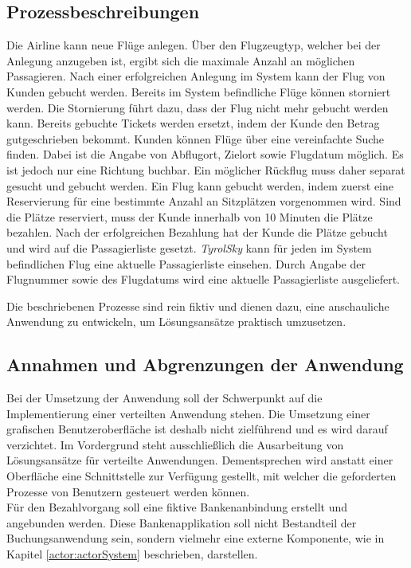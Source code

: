\subsection{Prozessbeschreibungen}
\begin{enumerate}
     Die Airline kann neue Flüge anlegen. Über den Flugzeugtyp, welcher bei der Anlegung anzugeben ist, ergibt sich die maximale Anzahl an möglichen Passagieren. Nach einer erfolgreichen Anlegung im System kann der Flug von Kunden gebucht werden.
     Bereits im System befindliche Flüge können storniert werden. Die Stornierung führt dazu, dass der Flug nicht mehr gebucht werden kann. Bereits gebuchte Tickets werden  ersetzt, indem der Kunde den Betrag gutgeschrieben bekommt.
    Kunden können Flüge über eine vereinfachte Suche finden. Dabei ist die Angabe von Abflugort, Zielort sowie Flugdatum möglich. Es ist jedoch nur  eine Richtung buchbar. Ein möglicher Rückflug muss daher separat gesucht und gebucht werden. 
    Ein Flug kann gebucht werden, indem zuerst eine Reservierung für eine bestimmte Anzahl an Sitzplätzen vorgenommen wird. Sind die Plätze reserviert, muss der Kunde innerhalb von 10 Minuten die Plätze bezahlen. Nach der erfolgreichen Bezahlung hat der Kunde die Plätze gebucht und wird auf die Passagierliste gesetzt. 
    \textit{TyrolSky} kann für jeden im System befindlichen Flug eine aktuelle Passagierliste einsehen. Durch Angabe der Flugnummer sowie des Flugdatums wird eine aktuelle Passagierliste ausgeliefert.
\end{enumerate}
Die beschriebenen Prozesse sind rein fiktiv und dienen dazu, eine anschauliche Anwendung zu entwickeln, um Lösungsansätze praktisch umzusetzen. 

\subsection{Annahmen und Abgrenzungen der Anwendung}
Bei der Umsetzung der Anwendung soll der Schwerpunkt auf die Implementierung einer verteilten Anwendung stehen. Die Umsetzung einer grafischen Benutzeroberfläche ist deshalb nicht zielführend und es wird darauf verzichtet. Im Vordergrund steht ausschließlich die Ausarbeitung von Lösungsansätze für verteilte Anwendungen. Dementsprechen wird anstatt einer Oberfläche eine Schnittstelle zur Verfügung gestellt, mit welcher die geforderten Prozesse von Benutzern gesteuert werden können. \\
Für den Bezahlvorgang soll eine fiktive Bankenanbindung erstellt und angebunden werden. Diese Bankenapplikation soll nicht Bestandteil der Buchungsanwendung sein, sondern vielmehr eine externe Komponente, wie in Kapitel \ref{actor:actorSystem} beschrieben, darstellen. 

